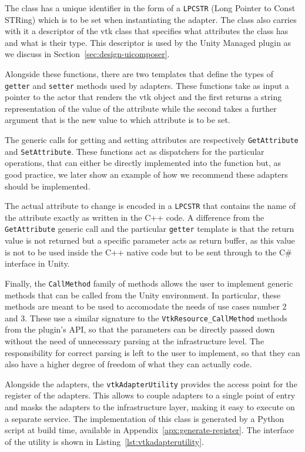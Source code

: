 The class has a unique identifier in the form of a \verb|LPCSTR| (Long Pointer to Const STRing) which is to be set when instantiating the adapter. The class also carries with it a descriptor of the \acrshort{vtk} class that specifies what attributes the class has and what is their type. This descriptor is used by the Unity Managed plugin as we discuss in Section~\ref{sec:design-uicomposer}.

Alongside these functions, there are two templates that define the types of \verb|getter| and \verb|setter| methods used by adapters. These functions take as input a pointer to the actor that renders the \acrshort{vtk} object and the first returns a string representation of the value of the attribute while the second takes a further argument that is the new value to which attribute is to be set.

The generic calls for getting and setting attributes are respectively \verb|GetAttribute| and \verb|SetAttribute|. These functions act as dispatchers for the particular operations, that can either be directly implemented into the function but, as good practice, we later show an example of how we recommend these adapters should be implemented.

The actual attribute to change is encoded in a \verb|LPCSTR| that contains the name of the attribute exactly as written in the C++ code. A difference from the \verb|GetAttribute| generic call and the particular \verb|getter| template is that the return value is not returned but a specific parameter acts as return buffer, as this value is not to be used inside the C++ native code but to be sent through to the C\# interface in Unity.

Finally, the \verb|CallMethod| family of methods allows the user to implement generic methods that can be called from the Unity environment. In particular, these methods are meant to be used to accomodate the needs of use cases number 2 and 3. These use a similar signature to the \verb|VtkResource_CallMethod| methods from the plugin's API, so that the parameters can be directly passed down without the need of unnecessary parsing at the infrastructure level. The responsibility for correct parsing is left to the user to implement, so that they can also have a higher degree of freedom of what they can actually code.

Alongside the adapters, the \verb|vtkAdapterUtility| provides the access point for the register of the adapters. This allows to couple adapters to a single point of entry and masks the adapters to the infrastructure layer, making it easy to execute on a separate service. The implementation of this class is generated by a Python script at build time, available in Appendix~\ref{apx:generate-register}. The interface of the utility is shown in Listing~\ref{lst:vtkadapterutility}.

